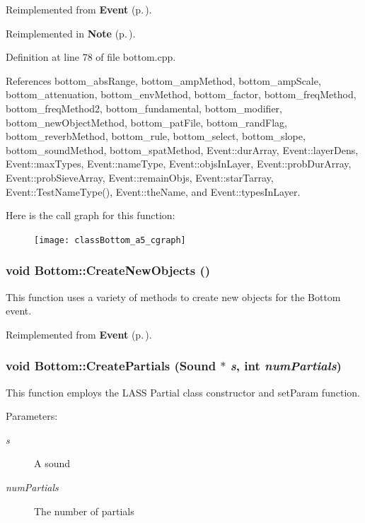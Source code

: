 Reimplemented from {\bf Event} {\rm (p.\,\pageref{classEvent_a12})}.

Reimplemented in {\bf Note} {\rm (p.\,\pageref{classNote_a14})}.

Definition at line 78 of file bottom.cpp.

References bottom\_\-abs\-Range, bottom\_\-amp\-Method, bottom\_\-amp\-Scale, bottom\_\-attenuation, bottom\_\-env\-Method, bottom\_\-factor, bottom\_\-freq\-Method, bottom\_\-freq\-Method2, bottom\_\-fundamental, bottom\_\-modifier, bottom\_\-new\-Object\-Method, bottom\_\-pat\-File, bottom\_\-rand\-Flag, bottom\_\-reverb\-Method, bottom\_\-rule, bottom\_\-select, bottom\_\-slope, bottom\_\-sound\-Method, bottom\_\-spat\-Method, Event::dur\-Array, Event::layer\-Dens, Event::max\-Types, Event::name\-Type, Event::objs\-In\-Layer, Event::prob\-Dur\-Array, Event::prob\-Sieve\-Array, Event::remain\-Objs, Event::star\-Tarray, Event::Test\-Name\-Type(), Event::the\-Name, and Event::types\-In\-Layer.

Here is the call graph for this function:\begin{figure}[H]
\begin{center}
\leavevmode
\texttt{[image: classBottom\_a5\_cgraph]}
\end{center}
\end{figure}
\subsubsection{\setlength{\rightskip}{0pt plus 5cm}void Bottom::Create\-New\-Objects ()}\label{classBottom_a11}


This function uses a variety of methods to create new objects for the Bottom event. 

Reimplemented from {\bf Event} {\rm (p.\,\pageref{classEvent_a22})}.
\subsubsection{\setlength{\rightskip}{0pt plus 5cm}void Bottom::Create\-Partials (Sound $\ast$ {\em s}, int {\em num\-Partials})}\label{classBottom_a17}


This function employs the LASS Partial class constructor and set\-Param function. \begin{Desc}
\item[Parameters:]
\begin{description}
\item[{\em s}]A sound \item[{\em num\-Partials}]The number of partials \end{description}
\end{Desc}


